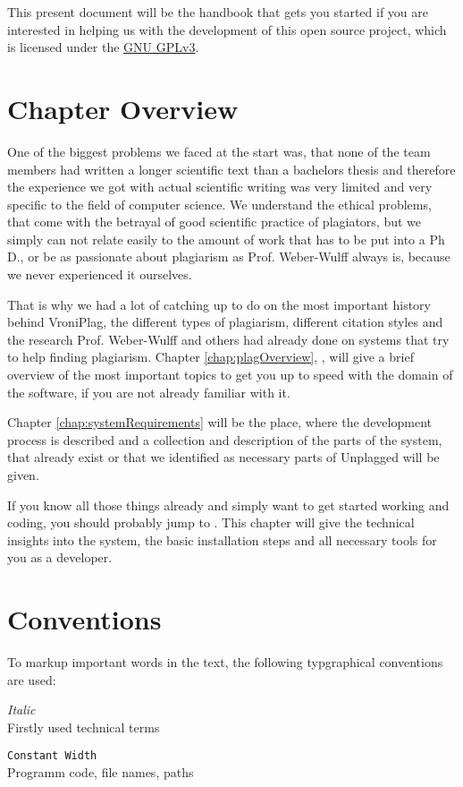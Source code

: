 This present document will be the handbook that gets you started if you are interested in helping us with the development of this 
open source project, which is licensed under the \href{http://www.gnu.org/licenses/quick-guide-gplv3}{GNU GPLv3}.

\section*{Chapter Overview}

One of the biggest problems we faced at the start was, that none of the team members had written a longer scientific
text than a bachelors
thesis and therefore the experience we got with actual scientific writing was very limited and very specific to the 
field of computer science. We understand the ethical problems, that come with the betrayal of 
good scientific practice of plagiators, but we simply can not relate easily to the amount of work that has to be put into 
a Ph D., or be as 
passionate about plagiarism as Prof. Weber-Wulff always is, because we never experienced it ourselves.

That is why we had a lot of catching up to do on the most important history behind VroniPlag, the different types
of plagiarism, different citation styles and the research Prof. Weber-Wulff and others had already done on systems that try to 
help finding plagiarism. Chapter \ref{chap:plagOverview}, , will
give a brief overview of the most important topics to get you up to speed with the domain of the software, if you are
not already familiar with it.

Chapter \ref{chap:systemRequirements} will be the place, where the development process is described and a collection and description 
of the parts of the system, that already exist or that we identified as 
necessary parts of Unplagged will be given.

If you know all those things already and simply want to get started working and coding, you should probably jump
to . This chapter will give the technical insights into the system, the basic installation
steps and all necessary tools for you as a developer.

\section*{Conventions}

To markup important words in the text, the following typgraphical conventions are used:

\begin{description}
\item \textit{Italic} \hfill \\
  Firstly used technical terms
\item \texttt{Constant Width} \hfill \\
  Programm code, file names, paths
\end{description}
